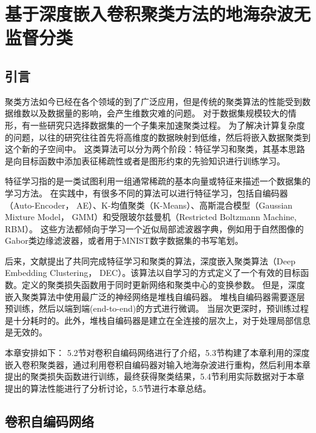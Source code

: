 
\chapter{基于深度嵌入卷积聚类方法的地海杂波无监督分类}
\section{引言}
聚类方法如今已经在各个领域的到了广泛应用，但是传统的聚类算法的性能受到数据维数以及数据量的影响，会产生维数灾难的问题。
对于数据集规模较大的情形，有一些研究只选择数据集的一个子集来加速聚类过程。
为了解决计算复杂度的问题，以往的研究往往首先将高维度的数据映射到低维，然后将嵌入数据聚类到这个新的子空间中。
这类算法可以分为两个阶段：特征学习和聚类，其基本思路是向目标函数中添加表征稀疏性或者是图形约束的先验知识进行训练学习。

特征学习指的是一类试图利用一组通常稀疏的基本向量或特征来描述一个数据集的学习方法。
在实践中，有很多不同的算法可以进行特征学习，包括自编码器（Auto-Encoder， AE）、K-均值聚类（K-Means）、高斯混合模型（Gaussian Mixture Model， GMM）和受限玻尔兹曼机（Restricted Boltzmann Machine, RBM）。
这些方法都倾向于学习一个近似局部滤波器字典，例如用于自然图像的Gabor类边缘滤波器，或者用于MNIST数字数据集的书写笔划。

后来，文献\cite{xie2016unsupervised}提出了共同完成特征学习和聚类的算法，深度嵌入聚类算法（Deep Embedding Clustering， DEC）。该算法以自学习的方式定义了一个有效的目标函数。定义的聚类损失函数用于同时更新网络和聚类中心的变换参数。
但是，深度嵌入聚类算法中使用最广泛的神经网络是堆栈自编码器。
堆栈自编码器需要逐层预训练，然后以端到端(end-to-end)的方式进行微调。
当层次更深时，预训练过程是十分耗时的。此外，堆栈自编码器是建立在全连接的层次上，对于处理局部信息是无效的。

本章安排如下： 5.2节对卷积自编码网络进行了介绍，5.3节构建了本章利用的深度嵌入卷积聚类器，通过利用卷积自编码器对输入地海杂波进行重构，然后利用本章提出的聚类损失函数进行训练，最终获得聚类结果，5.4节利用实际数据对于本章提出的算法性能进行了分析讨论，5.5节进行本章总结。

\section{卷积自编码网络}
